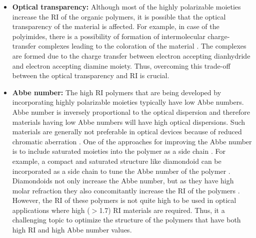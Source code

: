 \begin{itemize}
	\item\textbf{Optical transparency:} Although most of the highly polarizable moieties increase the RI of the organic polymers, it is possible that the optical transparency of the material is affected. For example, in case of the polyimides, there is a possibility of formation of intermolecular charge-transfer complexes leading to the coloration of the material \cite{Takasaki2000}. The complexes are formed due to the charge transfer between electron accepting dianhydride and electron accepting diamine moiety. Thus, overcoming this trade-off between the optical transparency and RI is crucial.

	\item\textbf{Abbe number:} The high RI polymers that are being developed by incorporating highly polarizable moieties typically have low Abbe numbers. Abbe number is inversely proportional to the optical dispersion and therefore materials having low Abbe numbers will have high optical dispersions. Such materials are generally not preferable in optical devices because of reduced chromatic aberration \cite{Robello2013}. One of the approaches for improving the Abbe number is to include saturated moieties into the polymer as a side chain \cite{Takano2010}. For example, a compact and saturated structure like diamondoid can be incorporated as a side chain to tune the Abbe number of the polymer \cite{Namikoshi2014}. Diamondoids not only increase the Abbe number, but as they have high molar refraction they also concomitantly increase the RI of the polymers \cite{Robello2013,Gunawan2014}. However, the RI of these polymers is not quite high to be used in optical applications where high ($>$1.7) RI materials are required. Thus, it a challenging topic to optimize the structure of the polymers that have both high RI and high Abbe number values.


\end{itemize}
